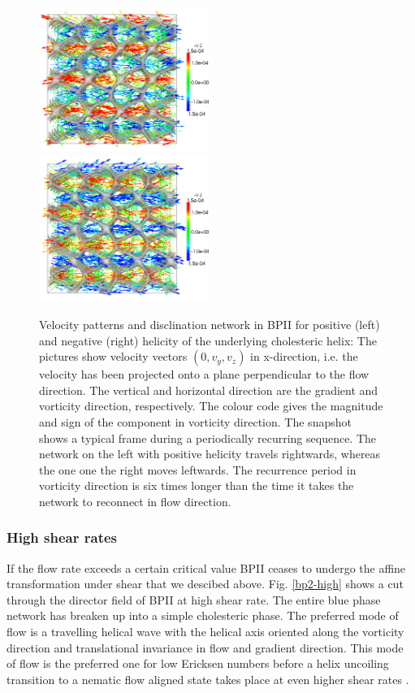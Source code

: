 \documentclass[aps,pre,reprint,superscriptaddress]{revtex4}
\begin{document}
\begin{figure}[h]
\includegraphics[width=0.495\textwidth]{v_yz-v_z-160k_run902.png}
\includegraphics[width=0.495\textwidth]{v_yz-v_z-160k_run903.png}
\caption{Velocity patterns and disclination network in BPII for positive (left) and negative (right) helicity of the 
underlying cholesteric helix: The pictures show velocity vectors $(0,v_y,v_z)$ in x-direction, 
i.e. the velocity has been projected onto a plane perpendicular to the flow direction. 
The vertical and horizontal direction are the gradient and vorticity direction, respectively.
The colour code gives the magnitude and sign of the component in vorticity direction.
The snapshot shows a typical frame during a periodically recurring sequence.
The network on the left with positive helicity travels rightwards, whereas the one one the right
moves leftwards. The recurrence period in vorticity direction is six times longer than the time it takes the network 
to reconnect in flow direction.}
\label{bp2-velo}
\end{figure}

\subsubsection{High shear rates}

If the flow rate exceeds a certain critical value BPII ceases to undergo the affine transformation under shear that we
descibed above. Fig. \ref{bp2-high} shows a cut through the director field of BPII at high shear rate.
The entire blue phase network has breaken up into a simple cholesteric phase. The preferred mode of flow is 
a travelling helical wave with the helical axis oriented along the vorticity direction and translational 
invariance in flow and gradient direction. This mode of flow is the preferred one for low Ericksen numbers
before a helix uncoiling transition to a nematic flow aligned state takes place at even higher
shear rates \cite{Rey:1996a, Rey:1996b}.
\end{document}
